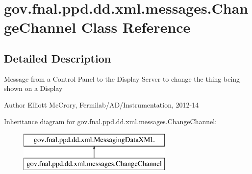 \hypertarget{classgov_1_1fnal_1_1ppd_1_1dd_1_1xml_1_1messages_1_1ChangeChannel}{\section{gov.\-fnal.\-ppd.\-dd.\-xml.\-messages.\-Change\-Channel Class Reference}
\label{classgov_1_1fnal_1_1ppd_1_1dd_1_1xml_1_1messages_1_1ChangeChannel}
}


\subsection{Detailed Description}
Message from a Control Panel to the Display Server to change the thing being shown on a Display

\begin{DoxyAuthor}{Author}
Elliott Mc\-Crory, Fermilab/\-A\-D/\-Instrumentation, 2012-\/14 
\end{DoxyAuthor}
Inheritance diagram for gov.\-fnal.\-ppd.\-dd.\-xml.\-messages.\-Change\-Channel\-:\begin{figure}[H]
\begin{center}
\leavevmode
\includegraphics[height=2.000000cm]{classgov_1_1fnal_1_1ppd_1_1dd_1_1xml_1_1messages_1_1ChangeChannel}
\end{center}
\end{figure}
